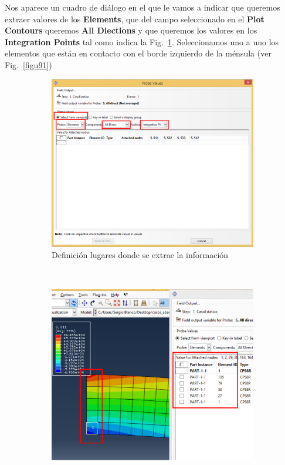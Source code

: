 \begin{enumerate}
 Nos aparece un cuadro de diálogo en el que le vamos a indicar que
 queremos extraer valores de los \textbf{Elements}, que del campo
 seleccionado en el \textbf{Plot Contours} queremos \textbf{All
   Diections} y que queremos los valores en los \textbf{Integration
   Points} tal como indica la Fig.~\ref{figu90}. Seleccionamos uno a
 uno los elementos que están en contacto con el borde izquierdo de la
 ménsula (ver Fig.~\ref{figu91})

 \begin{figure}[H]
   \centering
   \begin{subfigure}{0.45\textwidth}
     \includegraphics[width=\textwidth]{./body/images/imagen90.pdf}
     \caption{Definición lugares donde se extrae la información}
     \label{figu90}
   \end{subfigure}%
   ~ %
   \begin{subfigure}{0.49\textwidth}
     \includegraphics[width=\textwidth]{./body/images/imagen91.pdf}

\end{subfigure}
\end{figure}
\end{enumerate}
